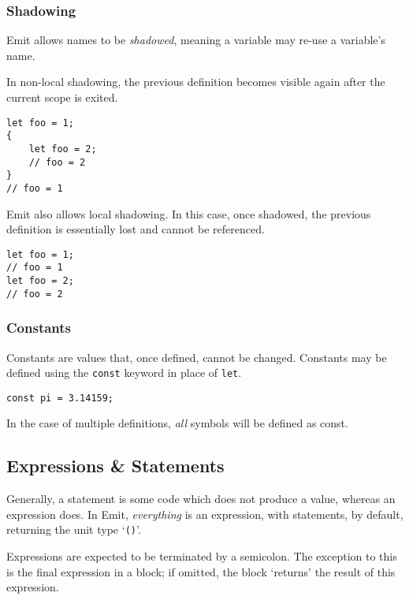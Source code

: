 \documentclass{article}
\begin{document}
    \subsubsection{Shadowing}

    Emit allows names to be \textit{shadowed}, meaning a variable may re-use a variable's name.

    In non-local shadowing, the previous definition becomes visible again after the current scope is exited.
    \begin{lstlisting}[language=CustomLang]
let foo = 1;
{
    let foo = 2;
    // foo = 2
}
// foo = 1
    \end{lstlisting}

    Emit also allows local shadowing.
    In this case, once shadowed, the previous definition is essentially lost and cannot be referenced.
    \begin{lstlisting}[language=CustomLang]
let foo = 1;
// foo = 1
let foo = 2;
// foo = 2
    \end{lstlisting}

    \subsubsection{Constants}

    Constants are values that, once defined, cannot be changed.
    Constants may be defined using the \texttt{const} keyword in place of \texttt{let}.

    \begin{lstlisting}[language=CustomLang]
const pi = 3.14159;
    \end{lstlisting}

    In the case of multiple definitions, \textit{all} symbols will be defined as const.

    \subsection{Expressions \& Statements}\label{subsec:expressions-&-statements}

    Generally, a statement is some code which does not produce a value, whereas an expression does.
    In Emit, \textit{everything} is an expression, with statements, by default, returning the unit type `\texttt{()}'.

    Expressions are expected to be terminated by a semicolon.
    The exception to this is the final expression in a block; if omitted, the block `returns' the result of this expression.
\end{document}
